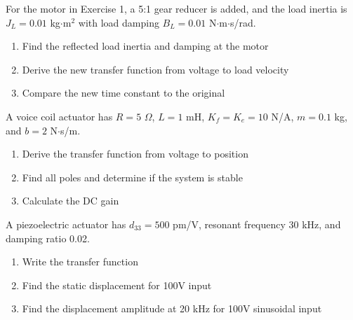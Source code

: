 \begin{exercise}
For the motor in Exercise 1, a 5:1 gear reducer is added, and the load inertia is $J_L = 0.01$ kg$\cdot$m$^2$ with load damping $B_L = 0.01$ N$\cdot$m$\cdot$s/rad.
\begin{enumerate}[label=(\alph*)]
    \item Find the reflected load inertia and damping at the motor
    \item Derive the new transfer function from voltage to load velocity
    \item Compare the new time constant to the original
\end{enumerate}
\end{exercise}

\begin{exercise}
A voice coil actuator has $R = 5$ $\Omega$, $L = 1$ mH, $K_f = K_e = 10$ N/A, $m = 0.1$ kg, and $b = 2$ N$\cdot$s/m.
\begin{enumerate}[label=(\alph*)]
    \item Derive the transfer function from voltage to position
    \item Find all poles and determine if the system is stable
    \item Calculate the DC gain
\end{enumerate}
\end{exercise}

\begin{exercise}
A piezoelectric actuator has $d_{33} = 500$ pm/V, resonant frequency 30 kHz, and damping ratio 0.02.
\begin{enumerate}[label=(\alph*)]
    \item Write the transfer function
    \item Find the static displacement for 100V input
    \item Find the displacement amplitude at 20 kHz for 100V sinusoidal input
\end{enumerate}
\end{exercise}


